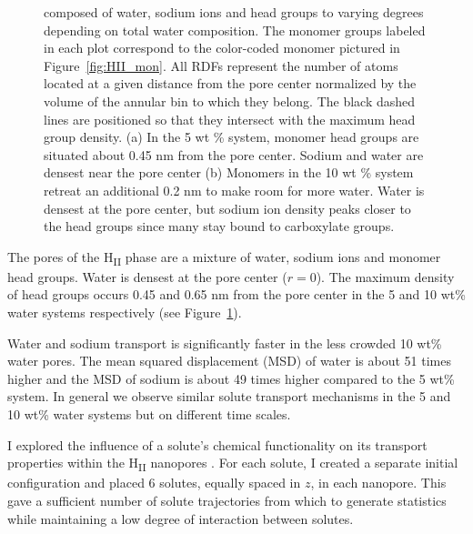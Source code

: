\documentclass{article}
\begin{document}
\begin{figure}
{  composed of water, sodium ions and head groups to varying degrees
  depending on total water composition. The monomer groups labeled in each plot correspond to
  the color-coded monomer pictured in Figure~\ref{fig:HII_mon}. All RDFs
  represent the number of atoms located at a given distance from the pore center
  normalized by the volume of the annular bin to which they belong. The black
  dashed lines are positioned so that they intersect with the maximum head group
  density. (a) In the 5 wt \% system, monomer head groups are situated about 0.45 nm
  from the pore center. Sodium and water are densest near the pore center 
  (b) Monomers in the 10 wt \% system retreat an additional 0.2 nm to make room
  for more water. Water is densest at the pore center, but sodium ion density
  peaks closer to the head groups since many stay bound to carboxylate groups.}\label{fig:component_densities}
  \vspace{-0.5cm}
  \end{figure}
  
  The pores of the H\textsubscript{II} phase are a mixture of water, sodium
  ions and monomer head groups. Water is densest at the pore center ($r = 0$).
  The maximum density of head groups occurs 0.45 and 0.65 nm from the pore 
  center in the 5 and 10 wt\% water systems respectively (see 
  Figure~\ref{fig:component_densities}).
    
  Water and sodium transport is significantly faster in the less crowded 
  10 wt\% water pores. The mean squared displacement (MSD) of water is about
  51 times higher and the MSD of sodium is about 49 times higher compared to
  the 5 wt\% system. In general we observe similar solute transport mechanisms
  in the 5 and 10 wt\% water systems but on different time scales.
  
  I explored the influence of a solute's chemical functionality on its 
  transport properties within the H\textsubscript{II} nanopores .
  For each solute, I created a separate initial configuration and placed 6 
  solutes, equally spaced in $z$, in each nanopore. This gave a sufficient
  number of solute trajectories from which to generate statistics while 
  maintaining a low degree of interaction between solutes. 
  
\end{document}
